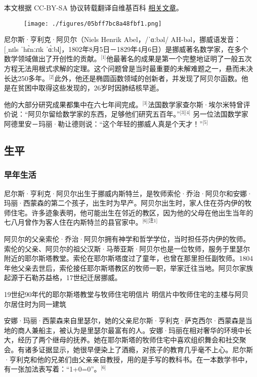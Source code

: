 
本文根据 CC-BY-SA 协议转载翻译自维基百科 \href{https://en.wikipedia.org/wiki/Niels_Henrik_Abel}{相关文章}。

\begin{figure}[ht]
\centering
\texttt{[image: ./figures/05bff7bc8a48fbf1.png]}
\caption{} \label{fig_NRSAB_5}
\end{figure}
尼尔斯·亨利克·阿贝尔（Niels Henrik Abel，/ˈɑːbəl/ AH-bəl，挪威语发音：[ˌnɪls ˈhɛ̀nːɾɪk ˈɑ̀ːbl̩]，1802年8月5日－1829年4月6日）是挪威著名数学家，在多个数学领域做出了开创性的贡献。\(^\text{[1]}\)他最著名的成果是第一个完整地证明了一般五次方程无法用根式求解的定理。这个问题曾是当时最重要的未解难题之一，悬而未决长达250多年。\(^\text{[2]}\)此外，他还是椭圆函数领域的创新者，并发现了阿贝尔函数。他是在贫困中取得这些发现的，26岁时因肺结核早逝。

他的大部分研究成果都集中在六七年间完成。\(^\text{[3]}\)法国数学家查尔斯·埃尔米特曾评价说：“阿贝尔留给数学家的东西，足够他们研究五百年。”\(^\text{[3][4]}\) 另一位法国数学家阿德里安－玛丽·勒让德则说：“这个年轻的挪威人真是个天才！”\(^\text{[5]}\)
\subsection{生平}
\subsubsection{早年生活}
尼尔斯·亨利克·阿贝尔出生于挪威内斯特兰，是牧师索伦·乔治·阿贝尔和安娜·玛丽·西蒙森的第二个孩子，出生时为早产。阿贝尔出生时，家人住在芬内伊的牧师住宅。许多迹象表明，他可能出生在邻近的教区，因为他的父母在他出生当年的七八月曾作为客人住在内斯特兰的县官家中。\(^\text{[6][注1]}\)

阿贝尔的父亲索伦·乔治·阿贝尔拥有神学和哲学学位，当时担任芬内伊的牧师。索伦的父亲、阿贝尔的祖父汉斯·马蒂亚斯·阿贝尔也是一位牧师，服务于里瑟尔附近的耶尔斯塔教堂。索伦在耶尔斯塔度过了童年，也曾在那里担任副牧师。1804年他父亲去世后，索伦接任耶尔斯塔教区的牧师一职，举家迁往当地。阿贝尔家族起源于石勒苏益格，17世纪迁居挪威。

19世纪90年代的耶尔斯塔教堂与牧师住宅明信片
明信片中牧师住宅的主楼与阿贝尔居住时为同一建筑

安娜·玛丽·西蒙森来自里瑟尔，她的父亲尼尔斯·亨利克·萨克西尔·西蒙森是当地的商人兼船主，被认为是里瑟尔最富有的人。安娜·玛丽在相对奢华的环境中长大，经历了两个继母的抚养。她在耶尔斯塔的牧师住宅中喜欢组织舞会和社交聚会。有诸多证据显示，她很早便染上了酒瘾，对孩子的教育几乎毫不上心。尼尔斯·亨利克和他的兄弟们由父亲亲自教授，用的是手写的教科书。在一本数学书中，有一张加法表写着：“1+0=0”。\(^\text{[6]}\)
